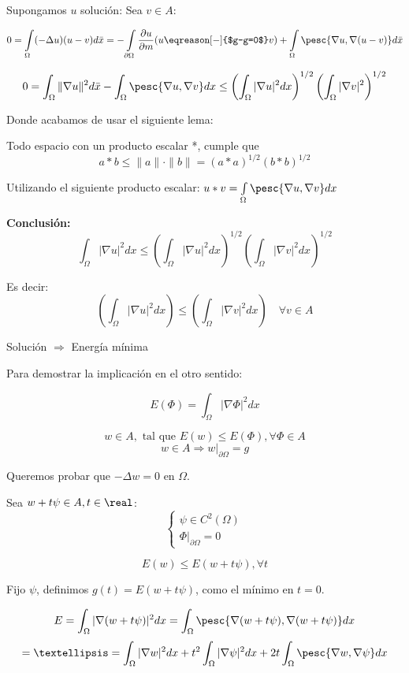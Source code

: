 		Supongamos $u$ solución:
		Sea $v \in A$:

		\[ 0 = \int\limits_\Omega (-\Delta u)(u-v) d\bar{x} = - \int\limits_{\partial\Omega} \frac{\partial u}{\partial m} (u \eqreason[-]{$g-g=0$}v) + \int\limits_\Omega \pesc{\nabla u, \nabla (u-v)} d\bar{x} \]

		\[ 0 = \int_\Omega \|\nabla u\|^2 d\bar{x} - \int_\Omega \pesc{\nabla u, \nabla v} dx \leq \left( \int_\Omega |\nabla u|^2 dx \right)^{1/2} \left( \int_\Omega |\nabla v|^2 \right)^{1/2} \]

		Donde acabamos de usar el siguiente lema:
		\begin{lemma}
			Todo espacio con un producto escalar *, cumple que
			\[ a * b \leq \|a\| \cdot \|b\| = (a*a)^{1/2} (b*b)^{1/2} \]
		\end{lemma}

		Utilizando el siguiente producto escalar: $u * v = \int\limits_{\Omega} \pesc{\nabla u, \nabla v} dx $

		\textbf{Conclusión:}
		\[ \int_\Omega | \nabla u|^2 dx \leq \left( \int_\Omega |\nabla u|^2 dx \right)^{1/2} \left( \int_\Omega |\nabla v|^2 dx \right)^{1/2} \]

		Es decir:
		\[ \left( \int_\Omega |\nabla u|^2 dx \right) \leq \left( \int_\Omega |\nabla v|^2 dx \right) \quad \forall v \in A \]

		Solución $\Rightarrow$ Energía mínima

		Para demostrar la implicación en el otro sentido:

		\[ E(\Phi) = \int_\Omega |\nabla \Phi|^2 dx \]

		\[ w \in A, \text{ tal que } E(w) \leq E(\Phi), \forall \Phi \in A\]
		\[ w \in A \Rightarrow w|_{\partial \Omega} = g\]

		Queremos probar que $-\Delta w = 0$ en $\Omega$.

		Sea $w+t\psi \in A, t \in \real$:
		\[\begin{cases}
			\psi \in C^2(\Omega)\\
			\Phi|_{\partial \Omega} = 0
	\end{cases}\]

		\[ E(w) \leq E(w + t \psi), \forall t\]

		Fijo $\psi$, definimos $g(t) = E(w + t \psi)$, como el mínimo en $t=0$.

		\[E= \int_\Omega | \nabla (w+t\psi)|^2 dx = \int_\Omega \pesc{\nabla (w+t\psi), \nabla(w + t \psi)} dx\]
		\[ = … = \int_\Omega |\nabla w|^2 dx + t^2 \int_\Omega |\nabla \psi|^2 dx + 2t\int_\Omega \pesc{\nabla w, \nabla \psi} dx \]


